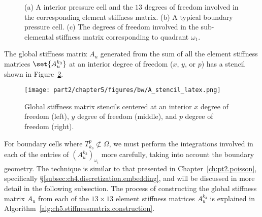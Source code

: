 \setlength{\figurewidth}{0.30\columnwidth}
\begin{figure}[htbp]
\begin{center}
\caption{(a) A interior pressure cell and the $13$ degrees of freedom involved in the corresponding element stiffness matrix. (b) A typical boundary pressure cell. (c) The degrees of freedom involved in the sub-elemental stiffness matrix corresponding to quadrant $\omega_1$. }
\label{fig:ch5:stiffnessmatrix.element}
\end{center}
\end{figure}

The global stiffness matrix $A_u$ generated from the sum of all the element stiffness matrices $\set{A_u^{k_3}}$ at an interior degree of freedom ($x$, $y$, or $p$) has a stencil shown in Figure~\ref{fig:ch5.stiffnessmatrix.global}.

\setlength{\figurewidth}{0.80\columnwidth}
\begin{figure}[htbp]
\begin{center}
\texttt{[image: part2/chapter5/figures/bw/A\_stencil\_latex.png]}
\caption{Global stiffness matrix stencils centered at an interior $x$ degree of freedom (left), $y$ degree of freedom (middle), and $p$ degree of freedom (right).}
\label{fig:ch5.stiffnessmatrix.global}
\end{center}
\end{figure}

For boundary cells where $T^p_{k_3} \not\subset \Omega$, we must perform the integrations involved in each of the entries of $(A_u^{k_3})_{\omega_i}$ more carefully, taking into account the boundary geometry. The technique is similar to that presented in Chapter~\ref{ch:pt2.poisson}, specifically \S\ref{subsec:ch4.discretization.embedding}, and will be discussed in more detail in the following subsection. The process of constructing the global stiffness matrix $A_u$ from each of the $13 \times 13$ element stiffness matrices $A_u^{k_3}$ is explained in Algorithm~\ref{alg:ch5.stiffnessmatrix.construction}.

